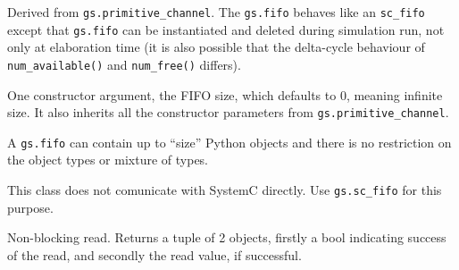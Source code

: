 \documentclass[12pt,oneside]{gsbook}
\begin{document}
\newpage
{} {Derived from \texttt{gs.primitive\_channel}.  The
\texttt{gs.fifo} behaves like an \texttt{sc\_fifo} except that
\texttt{gs.fifo} can be instantiated and deleted during simulation
run, not only at elaboration time (it is also possible that the
delta-cycle behaviour of \texttt{num\_available()} and \texttt{num\_free()}
differs).

One constructor argument, the FIFO size, which defaults to 0, meaning
infinite size.  It also inherits all the constructor parameters from
\texttt{gs.primitive\_channel}.

A \texttt{gs.fifo} can contain up to ``size'' Python objects and there
is no restriction on the object types or mixture of types.

This class does not comunicate with SystemC directly. Use
\texttt{gs.sc\_fifo} for this purpose.}

\begin{methods}


 {Non-blocking read. Returns a tuple of 2 objects, firstly
a bool indicating success of the read, and secondly the read value, if
successful.}









\end{methods}
\end{document}
